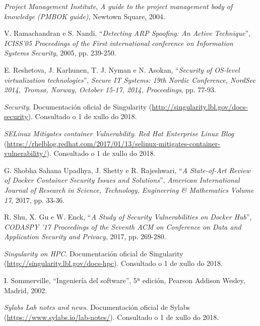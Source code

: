 \begin{thebibliography}{99}
 \textit{Project Management Institute}, \textit{A guide to the project management body of knowledge (PMBOK guide)}, Newtown Square, 2004.

 V. Ramachandran e S. Nandi, ``\textit{Detecting ARP Spoofing: An Active Technique}'', \textit{
ICISS'05 Proceedings of the First international conference on Information Systems Security}, 2005, pp. 239-250.

 E. Reshetova, J. Karhunen, T. J. Nyman e N. Asokan, ``\textit{Security of OS-level virtualization technologies}'', {\it Secure IT Systems: 19th Nordic Conference, NordSec 2014, Tromsø, Norway, October 15-17, 2014, Proceedings}, pp. 77-93.

 \textit{Security}. Documentación oficial de Singularity (\url{http://singularity.lbl.gov/docs-security}). Consultado o 1 de xullo do 2018.

 \textit{SELinux Mitigates container Vulnerability}. \textit{Red Hat Enterprise Linux Blog} (\url{https://rhelblog.redhat.com/2017/01/13/selinux-mitigates-container-vulnerability/}). Consultado o 1 de xullo do 2018.

 G. Shobha Sahana Upadhya, J. Shetty e R. Rajeshwari, ``\textit{A State-of-Art Review of Docker Container Security Issues and Solutions}'', {\it American International Journal of Research in Science, Technology, Engineering \& Mathematics Volume
17}, 2017, pp. 33-36.

 R. Shu, X. Gu e W. Enck, ``\textit{A Study of Security Vulnerabilities on Docker Hub}'', {\it CODASPY '17 Proceedings of the Seventh ACM on Conference on Data and Application Security and Privacy}, 2017, pp. 269-280.

 \textit{Singularity on HPC}. Documentación oficial de Singularity (\url{http://singularity.lbl.gov/docs-hpc}). Consultado o 1 de xullo do 2018.

 I. Sommerville, ``Ingeniería del software'', 5ª edición, Pearson Addison Wesley, Madrid, 2002.

 \textit{Sylabs Lab notes and news}. Documentación oficial de Sylabs (\url{https://www.sylabs.io/lab-notes/}). Consultado o 1 de xullo do 2018.


\end{thebibliography}
